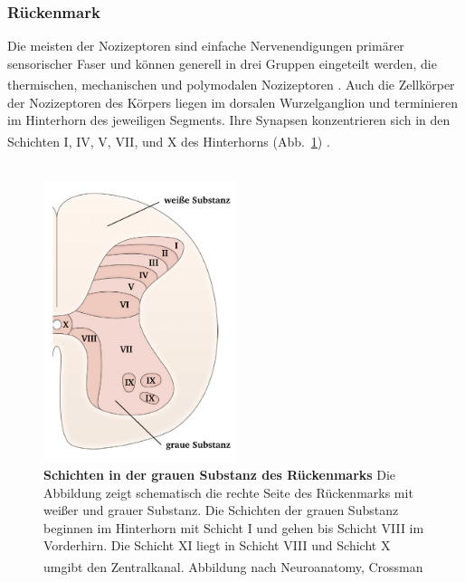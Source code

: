 \documentclass[12pt,a4paper,pdftex]{article}
\begin{document}
\subsubsection*{Rückenmark}

Die meisten der Nozizeptoren  sind einfache Nervenendigungen primärer sensorischer Faser und können generell in drei Gruppen eingeteilt werden, die thermischen, mechanischen und polymodalen Nozizeptoren \textsuperscript{\cite[24]{kandel2013principles}}. Auch die Zellkörper der Nozizeptoren des Körpers liegen im dorsalen Wurzelganglion und terminieren im Hinterhorn des jeweiligen Segments. Ihre Synapsen konzentrieren sich in den Schichten I, IV, V, VII, und X des Hinterhorns (Abb.~\ref{fig:graymatter}) \textsuperscript{\cite[25]{paxinos2014rat}}.
\\
\\

\begin{figure}[H]
        \centering
        \includegraphics[width = 0.5\textwidth]
        {pictures/somatosensory/gray_matter.png}
        \caption[Schichten in der grauen Substanz des Rückenmarks]{\textbf{Schichten in der grauen Substanz des Rückenmarks} Die Abbildung zeigt schematisch die rechte Seite des Rückenmarks mit weißer und grauer Substanz. Die Schichten der grauen Substanz beginnen im Hinterhorn mit Schicht I und gehen bis Schicht VIII im Vorderhirn. Die Schicht XI liegt in Schicht VIII und Schicht X umgibt den Zentralkanal. Abbildung nach Neuroanatomy, Crossman
        \textsuperscript{\cite[8]{crossman2014neuroanatomy}}}
        \label{fig:graymatter}
    \end{figure}
\end{document}
